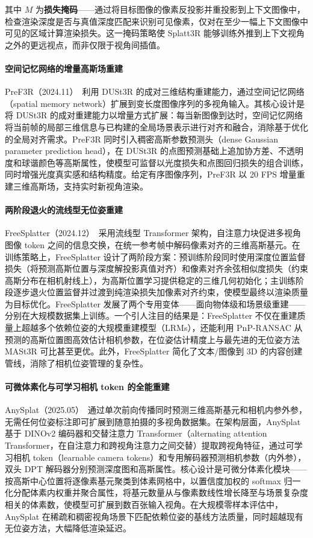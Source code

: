 其中 $M$ 为\textbf{损失掩码}——通过将目标图像的像素反投影并重投影到上下文图像中，检查渲染深度是否与真值深度匹配来识别可见像素，仅对在至少一幅上下文图像中可见的区域计算渲染损失。这一掩码策略使 Splatt3R 能够训练外推到上下文视角之外的更远视点，而非仅限于视角间插值。

\paragraph{空间记忆网络的增量高斯场重建}

PreF3R（2024.11）~\cite{2411_16877}利用 DUSt3R 的成对三维结构重建能力，通过空间记忆网络（spatial memory network）扩展到变长度图像序列的多视角输入。其核心设计是将 DUSt3R 的成对重建能力以增量方式扩展：每当新图像到达时，空间记忆网络将当前帧的局部三维信息与已构建的全局场景表示进行对齐和融合，消除基于优化的全局对齐需求。PreF3R 同时引入稠密高斯参数预测头（dense Gaussian parameter prediction head），在 DUSt3R 的点图预测基础上追加协方差、不透明度和球谐颜色等高斯属性，使模型可监督以光度损失和点图回归损失的组合训练，同时增强光度真实感和结构精度。给定有序图像序列，PreF3R 以 20 FPS 增量重建三维高斯场，支持实时新视角渲染。

\paragraph{两阶段退火的流线型无位姿重建}

FreeSplatter（2024.12）~\cite{2412_09573}采用流线型 Transformer 架构，自注意力块促进多视角图像 token 之间的信息交换，在统一参考帧中解码像素对齐的三维高斯基元。在训练策略上，FreeSplatter 设计了两阶段方案：预训练阶段同时使用深度位置监督损失（将预测高斯位置与深度解投影真值对齐）和像素对齐余弦相似度损失（约束高斯分布在相机射线上），为高斯位置学习提供稳定的三维几何初始化；主训练阶段逐步退火位置监督并过渡到纯渲染损失加像素对齐约束，使模型最终以渲染质量为目标优化。FreeSplatter 发展了两个专用变体——面向物体级和场景级重建——分别在大规模数据集上训练。一个引人注目的结果是：FreeSplatter 不仅在重建质量上超越多个依赖位姿的大规模重建模型（LRMs），还能利用 PnP-RANSAC 从预测的高斯位置图高效估计相机参数，在位姿估计精度上与最先进的无位姿方法 MASt3R 可比甚至更优。此外，FreeSplatter 简化了文本/图像到 3D 的内容创建管线，消除了相机位姿管理的复杂性。

\paragraph{可微体素化与可学习相机 token 的全能重建}

AnySplat（2025.05）~\cite{2505_23716}通过单次前向传播同时预测三维高斯基元和相机内参外参，无需任何位姿标注即可扩展到随意拍摄的多视角数据集。在架构层面，AnySplat 基于 DINOv2 编码器和交替注意力 Transformer（alternating attention Transformer，在自注意力和跨视角注意力之间交替）提取跨视角特征，通过可学习相机 token（learnable camera tokens）和专用解码器预测相机参数（内外参），双头 DPT 解码器分别预测深度图和高斯属性。核心设计是可微分体素化模块——按高斯中心位置将逐像素基元聚类到体素网格中，以置信度加权的 softmax 归一化分配体素内权重并聚合属性，将基元数量从与像素数线性增长降至与场景复杂度相关的体素数，使模型可扩展到数百张输入视角。在大规模零样本评估中，AnySplat 在稀疏和稠密视角场景下匹配依赖位姿的基线方法质量，同时超越现有无位姿方法，大幅降低渲染延迟。

